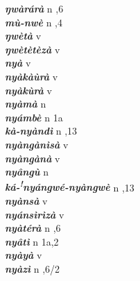 \begin{multicols}{2}
{{\bfseries\itshape ŋwàrárà}} \relax  n  ,6  \relax   \relax  \\
{{\bfseries\itshape mù-nwè}} \relax  n  ,4  \relax   \relax  \\
{{\bfseries\itshape ŋwètà}} \relax  v  \relax   \relax  {} \relax   \relax  \\
{{\bfseries\itshape ŋwètètèzà}} \relax  v  \relax   \relax  {} \relax   \relax  \\
{{\bfseries\itshape nyà}} \relax  v  \relax   \relax  {} \relax   \relax  \\
{{\bfseries\itshape nyàkàùrà}} \relax  v  \relax   \relax  {} \relax   \relax  \\
{{\bfseries\itshape nyàkùrà}} \relax  v  \relax   \relax  {} \relax   \relax  \\
{{\bfseries\itshape nyàmà}} \relax  n   \relax  {} \relax   \relax  \\
{{\bfseries\itshape nyámbè}} \relax  n  \relax  1a \relax  {} \relax   \relax  \\
{{\bfseries\itshape kà-nyàndì}} \relax  n  ,13  \relax   \relax  \\
{{\bfseries\itshape nyàngànìsà}} \relax  v  \relax   \relax  {} \relax   \relax  \\
{{\bfseries\itshape nyàngànà}} \relax  v  \relax   \relax  {} \relax   \relax  \\
{{\bfseries\itshape nyângù}} \relax  n   \relax  {} \relax   \relax  \\
{{\bfseries\itshape ká-\textsuperscript{!}nyángwé-nyàngwè}} \relax  n  ,13  \relax   \relax  \\
{{\bfseries\itshape nyànsà}} \relax  v  \relax   \relax  {} \relax   \relax  \\
{{\bfseries\itshape nyánsìrìzà}} \relax  v  \relax   \relax  {} \relax  \\
{{\bfseries\itshape nyàtérà}} \relax  n  ,6  \relax   \relax  \\
{{\bfseries\itshape nyâtì}} \relax  n  \relax  1a,2  \relax   \relax  \\
{{\bfseries\itshape nyàyà}} \relax  v  \relax   \relax  {} \relax   \relax  \\
{{\bfseries\itshape nyàzì}} \relax  n  ,6/2 
\end{multicols}
